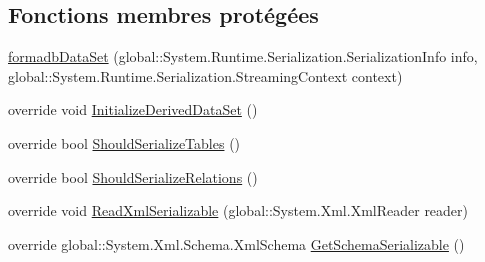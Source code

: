 \subsection*{Fonctions membres protégées}
\begin{DoxyCompactItemize}
\item 
\hyperlink{classforma_1_1formadb_data_set_aa24fbaeb29e35e45dedc268d138e8af5}{formadb\+Data\+Set} (global\+::\+System.\+Runtime.\+Serialization.\+Serialization\+Info info, global\+::\+System.\+Runtime.\+Serialization.\+Streaming\+Context context)
\item 
override void \hyperlink{classforma_1_1formadb_data_set_ad45fd7e32936393814528a8d5aee973a}{Initialize\+Derived\+Data\+Set} ()
\item 
override bool \hyperlink{classforma_1_1formadb_data_set_a48d788c326a2efd68ffccd013df80d1d}{Should\+Serialize\+Tables} ()
\item 
override bool \hyperlink{classforma_1_1formadb_data_set_ad61aefcf3ed38d7f450308beb2a8b8de}{Should\+Serialize\+Relations} ()
\item 
override void \hyperlink{classforma_1_1formadb_data_set_a5827a68b24b6fb15bf8a1ea1484e654d}{Read\+Xml\+Serializable} (global\+::\+System.\+Xml.\+Xml\+Reader reader)
\item 
override global\+::\+System.\+Xml.\+Schema.\+Xml\+Schema \hyperlink{classforma_1_1formadb_data_set_abfe34e08edcdbea2be0b5090a588e683}{Get\+Schema\+Serializable} ()
\end{DoxyCompactItemize}
